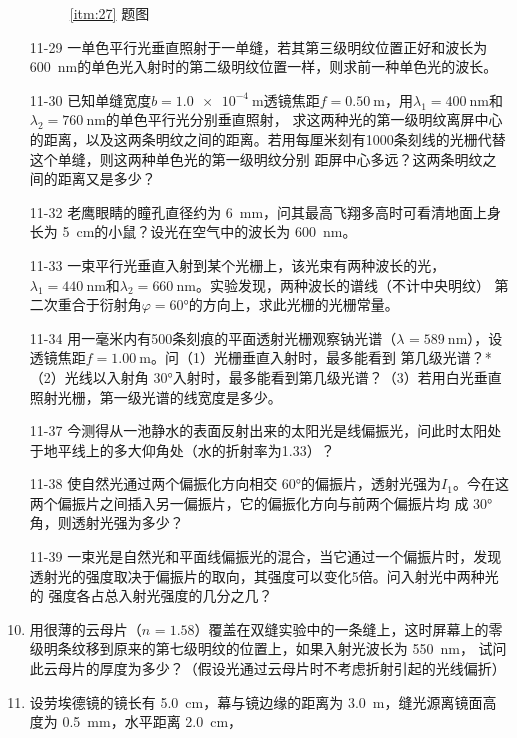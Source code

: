 \documentclass[UTF-8]{ctexart}
\newcommand{\csi}[2]{ \SI{#1}{#2}}
\newcommand{\cang}[1]{ \ang{#1}}
\newcommand{\lbd}[3]{\(\lambda_{#3}=\csi{#1}{#2}\)}
\newcommand{\ri}[2]{\(n_{#2}={#1}\)}
\begin{document}
\begin{enumerate}
\begin{figure}[htb]
\begin{minipage}[b]{0.4\textwidth}
                \caption{\ref{itm:27} 题图}
            \end{minipage}
        \end{figure}
    \item[11-29] 一单色平行光垂直照射于一单缝，若其第三级明纹位置正好和波长为\csi{600}{\nm}的单色光入射时的第二级明纹位置一样，则求前一种单色光的波长。
    \item[11-30] 已知单缝宽度\(b=\csi{1.0e-4}{\m}\)透镜焦距\(f=\csi{0.50}{\m}\)，用\lbd{400}{\nm}{1}和\lbd{760}{\nm}{2}的单色平行光分别垂直照射，
        求这两种光的第一级明纹离屏中心的距离，以及这两条明纹之间的距离。若用每厘米刻有1000条刻线的光栅代替这个单缝，则这两种单色光的第一级明纹分别
        距屏中心多远？这两条明纹之间的距离又是多少？
    \item[11-32] 老鹰眼睛的瞳孔直径约为\csi{6}{\mm}，问其最高飞翔多高时可看清地面上身长为\csi{5}{\cm}的小鼠？设光在空气中的波长为\csi{600}{\nm}。
    \item[11-33] 一束平行光垂直入射到某个光栅上，该光束有两种波长的光，\lbd{440}{\nm}{1}和\lbd{660}{\nm}{2}。实验发现，两种波长的谱线（不计中央明纹）
        第二次重合于衍射角\(\varphi=\ang{60}\)的方向上，求此光栅的光栅常量。
    \item[11-34] 用一毫米内有500条刻痕的平面透射光栅观察钠光谱（\lbd{589}{\nm}{}），设透镜焦距\(f=\csi{1.00}{\m}\)。问（1）光栅垂直入射时，最多能看到
        第几级光谱？*\negthinspace（2）光线以入射角\cang{30}入射时，最多能看到第几级光谱？（3）若用白光垂直照射光栅，第一级光谱的线宽度是多少。
    \item[11-37] 今测得从一池静水的表面反射出来的太阳光是线偏振光，问此时太阳处于地平线上的多大仰角处（水的折射率为1.33）？
    \item[11-38] 使自然光通过两个偏振化方向相交\cang{60}的偏振片，透射光强为\(I_1\)。今在这两个偏振片之间插入另一偏振片，它的偏振化方向与前两个偏振片均
        成\cang{30}角，则透射光强为多少？
    \item[11-39] 一束光是自然光和平面线偏振光的混合，当它通过一个偏振片时，发现透射光的强度取决于偏振片的取向，其强度可以变化5倍。问入射光中两种光的
        强度各占总入射光强度的几分之几？
    \item 用很薄的云母片（\ri{1.58}{}）覆盖在双缝实验中的一条缝上，这时屏幕上的零级明条纹移到原来的第七级明纹的位置上，如果入射光波长为\csi{550}{\nm}，
        试问此云母片的厚度为多少？（假设光通过云母片时不考虑折射引起的光线偏折）
    \item \label{itm:s2} 设劳埃德镜的镜长有\csi{5.0}{\cm}，幕与镜边缘的距离为\csi{3.0}{\m}，缝光源离镜面高度为\csi{0.5}{\mm}，水平距离\csi{2.0}{\cm}，

\end{enumerate}
\end{document}
